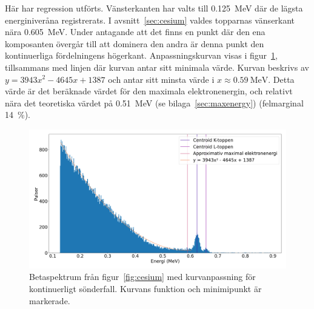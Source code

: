 Här har regression utförts. Vänsterkanten har valts till \qty{0.125}{\MeV} där
de lägsta energiniveråna registrerats. I avsnitt~\ref{sec:cesium} valdes
topparnas vänserkant nära \qty{0.605}{\MeV}. Under antagande att det finns en
punkt där den ena komposanten övergår till att dominera den andra är denna
punkt den kontinuerliga fördelningens högerkant. Anpassningskurvan visas i
figur~\ref{fig:cesiumcurve}, tillsammans med linjen där kurvan antar sitt
minimala värde. Kurvan beskrivs av
$y = \num{3943}x^2 - \num{4645}x + \num{1387}$ och antar sitt minsta värde i
$x \approx \qty{0.59}{\MeV}$. Detta värde är det beräknade värdet för den
maximala elektronenergin, och relativt nära det teoretiska värdet på
\qty{0.51}{\MeV} (se bilaga~\ref{sec:maxenergy}) (felmarginal
\qty{14}{\percent}).

\begin{figure}[!hp]
    \centering
    \includegraphics[width=\textwidth, keepaspectratio]{../images/cesium_curve.png}
    \caption{
        Betaspektrum från figur~\ref{fig:cesium} med kurvanpassning för
        kontinuerligt sönderfall. Kurvans funktion och minimipunkt är
        markerade.
    }
    \label{fig:cesiumcurve}
\end{figure}
